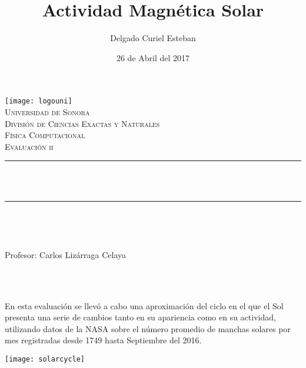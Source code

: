 \documentclass[12pt]{article}
\title{Actividad Magnética Solar}  %
\author{\centering Delgado Curiel Esteban}											%
\date{26 de Abril del 2017} %
\makeatletter
\let\thetitle\@title
\let\theauthor\@author
\let\thedate\@date
\makeatother
\begin{document}

\begin{titlepage}
	\begin{centering}
    
    \vspace*{0.5 cm}
    \texttt{[image: logouni]}\\[0.5 cm]	%
    \textsc{\Large Universidad de Sonora}\\[1.0 cm]	%
	\textsc{\Large División de Ciencias Exactas y Naturales}\\[0.5 cm]				%
	\textsc{\large Física Computacional}\\[0.5 cm]	
    
    \textsc{\large Evaluación ii}\\[0.5 cm]
	\rule{\linewidth}{0.2 mm} \\[0.4 cm]
	{ \huge \bfseries \thetitle}\\
	\rule{\linewidth}{0.2 mm} \\[0.5 cm]
	
	\begin{minipage}{\textwidth}
		\begin{flushleft} 
			\emph{\Large} \large \\
			\theauthor
			\end{flushleft}
	
		\begin{flushleft} 
			{Profesor:} \large \centering Carlos Lizárraga Celaya	
			\end{flushleft}
	\end{minipage}\\[1 cm]
	{\large \thedate}\\[2 cm]
 
	\vfill
    \end{centering}
    \end{titlepage}
    
    
\newpage
En esta evaluación se llevó a cabo una aproximación del ciclo en el que el Sol presenta una serie de cambios tanto en su apariencia como en su actividad, utilizando datos de la NASA sobre el número promedio de manchas solares por mes registradas desde 1749 hasta Septiembre del 2016.

\begin{center}
\texttt{[image: solarcycle]}
\end{center}
\end{document}
